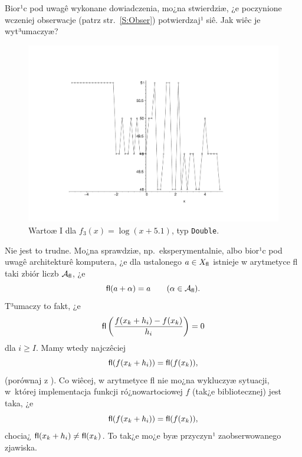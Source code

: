 \documentclass[11pt,leqno]{article}
\begin{document}
Bior¹c pod uwagê wykonane dowiadczenia, mo¿na stwierdziæ, ¿e poczynione
wczeniej obserwacje (patrz str.~\ref{S:Obser}) potwierdzaj¹ siê. Jak wiêc
je wyt³umaczyæ? 

\begin{center}
\begin{figure}[!ht]
\vspace{-2cm}
\hspace{-1.5cm}
\includegraphics[scale=0.65,angle=0]{wyk4.pdf}
\vspace{-2cm}
\caption{Wartoæ I dla $f_3(x)=\log(x+5.1)$, typ \texttt{Double}.}\label{W:Wyk4}
\end{figure}
\end{center}

Nie jest to trudne. Mo¿na sprawdziæ, np.~eksperymentalnie, albo bior¹c pod uwagê
architekturê komputera, ¿e dla ustalonego  
$a\in X_{\mbox{\textsf{\scriptsize fl}}}$ istnieje w arytmetyce \textsf{fl}
taki zbiór liczb ${\cal A}_{\mbox{\textsf{\scriptsize fl}}}$, ¿e
$$
\mbox{\textsf{fl}}(a+\alpha)=a\qquad (\alpha\in
                                {\cal A}_{\mbox{\textsf{\scriptsize fl}}}).
$$
T³umaczy to fakt, ¿e
$$
\mbox{\textsf{fl}}\left(\frac{f(x_k+h_i)-f(x_k)}{h_i}\right)=0
$$
dla $i\geq I$. Mamy wtedy najczêciej
$$
\mbox{\textsf{fl}}(f(x_k+h_i))=\mbox{\textsf{fl}}(f(x_k)),
$$
(porównaj z \cite[przyk³ad 1.7]{JJ}). Co wiêcej, w arytmetyce \textsf{fl} nie
mo¿na wykluczyæ sytuacji, w~której implementacja funkcji ró¿nowartociowej $f$
(tak¿e bibliotecznej) jest taka, ¿e
$$
\mbox{\textsf{fl}}(f(x_k+h_i))=\mbox{\textsf{fl}}(f(x_k)),
$$
chocia¿ $\mbox{\textsf{fl}}(x_k+h_i)\neq\mbox{\textsf{fl}}(x_k)$. To tak¿e mo¿e
byæ przyczyn¹ zaobserwowanego zjawiska.
\end{document}
